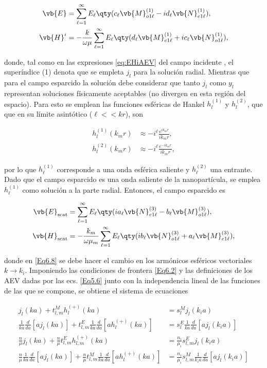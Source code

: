 \begin{align}
\vb{E} &= \sum_{\ell =1}^\infty E_{\ell}\qty(c_{\ell}\vb{M}_{o1\ell}^{(1)}-id_{\ell}\vb{N}_{e1\ell}^{(1)}),\\
\vb{H}^i &= -\frac{k}{\omega\mu}\sum_{\ell =1}^\infty E_{\ell}\qty(d_{\ell}\vb{M}_{e1\ell}^{(1)}+ic_{\ell}\vb{N}_{o1\ell}^{(1)}),
\end{align}

donde, tal como en las expresiones \eqref{eq:EHiAEV} del campo incidente , el superíndice (1) denota que se empleta $j_l$ para la solución radial. Mientras que para el campo esparcido la solución debe considerar que tanto $j_l$ como $y_l$ representan soluciones físicamente aceptables (no divergen en esta región del espacio). Para esto se emplean las funciones esféricas de Hankel $h_l^{(1)}$ y $h_l^{(2)}$, que que en su límite asintótico ($\ell<<kr$), son

\begin{align*}
h_l^{(1)}(k_mr)&\approx-i^{\ell}\frac{e^{ik_mr}}{ik_mr},\\
h_l^{(2)}(k_mr)&\approx-i^{\ell}\frac{e^{-ik_mr}}{ik_mr},
\end{align*}

por lo que $h_{\ell}^{(1)}$ corresponde a una onda esférica saliente y $h_{\ell}^{(2)}$ una entrante. Dado que el campo esparcido es una onda saliente de la nanopartícula, se emplea $h_{\ell}^{(1)}$ como solución a la parte radial. Entonces, el campo esparcido es


\begin{align}
\vb{E}_{\text{scat}} &= \sum_{\ell =1}^\infty E_{\ell}\qty(ia_{\ell}\vb{N}_{e1\ell}^{(3)}-b_{\ell}\vb{M}_{o1\ell}^{(3)}),\\
\vb{H}_{\text{scat}} &= -\frac{k_m}{\omega\mu_m}\sum_{\ell =1}^\infty E_{\ell}\qty(ib_{\ell}\vb{N}_{o1\ell}^{(3)}+a_{\ell}\vb{M}_{e1\ell}^{(3)}),
\end{align}

donde en \eqref{Eq6.8} se debe hacer el cambio en los armónicos esféricos vectoriales $k\rightarrow k_i$. Imponiendo las condiciones de frontera \eqref{Eq6.2} y las definiciones de los AEV dadas por las ecs. \eqref{Eq5.6} junto con la independencia lineal de las funciones de las que se compone, se obtiene el sistema de ecuaciones

\begin{subequations}
\begin{align}
j_l(ka)+t_{l,m}^M h_l^{(+)}(ka)&=s_l^M j_l(k_i a)	\\
\frac{1}{ka}\frac{d}{da}[aj_l(ka)]+t_{l,m}^E\frac{1}{ka}\frac{d}{da}[ah_l^{(+)}(ka)]&=s_l^E\frac{1}{ka}\frac{d}{da}[aj_l(k_i a)]	\\
\frac{n}{\mu}j_l(ka)+\frac{n}{\mu}t_{l,m}^E h_{l,m}^{(+)}(ka)&=\frac{n_i}{\mu_i}s_{l,m}^Ej_l(k_i a)	\\
\frac{n}{\mu}\frac{1}{ka}\frac{d}{da}[aj_l(ka)]+\frac{n}{\mu}t_{l,m}^M\frac{1}{ka}\frac{d}{da}[ah_l^{(+)}(ka)]&=\frac{n_i}{\mu_i}s_{l,m}^M\frac{1}{k_i a}\frac{d}{da}[aj_l(k_ia)]
\end{align}
\label{Eq6.9}
\end{subequations}

